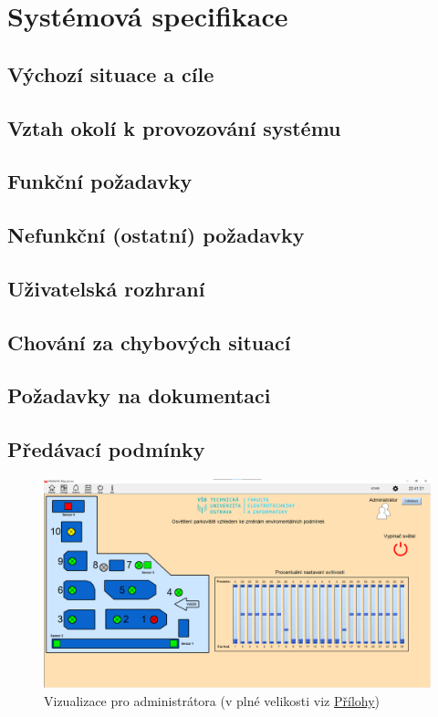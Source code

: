 \chapter{Systémová specifikace}

\section{Výchozí situace a cíle}
\section{Vztah okolí k provozování systému}
\section{Funkční požadavky}
\section{Nefunkční (ostatní) požadavky}
\section{Uživatelská rozhraní}
\section{Chování za chybových situací}
\section{Požadavky na dokumentaci}
\section{Předávací podmínky}



\begin{figure}[H]
    \centering\includegraphics[width=\textwidth]{Figures/Promotic_admin_vizualizace.png}   
    \caption{Vizualizace pro administrátora (v plné velikosti viz \hyperref[Sec-Prilohy]{Přílohy})}
    \label{Obr-Viz_admin}
\end{figure}

